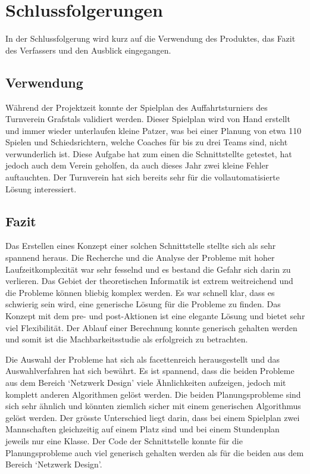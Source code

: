 %
%


\chapter{Schlussfolgerungen}\label{chap.Schlussfolgerungen}
In der Schlussfolgerung wird kurz auf die Verwendung des Produktes, das Fazit des Verfassers und den Ausblick eingegangen.

\section{Verwendung}\label{fazit_verwendung}
Während der Projektzeit konnte der Spielplan des Auffahrtsturniers des Turnverein Grafstals validiert werden. Dieser Spielplan wird von Hand erstellt und immer wieder unterlaufen 
kleine Patzer, was bei einer Planung von etwa 110 Spielen und Schiedsrichtern, welche Coaches für bis zu drei Teams sind, nicht verwunderlich ist. Diese Aufgabe hat zum einen die Schnittstellte 
getestet, hat jedoch auch dem Verein geholfen, da auch dieses Jahr zwei kleine Fehler auftauchten. Der Turnverein hat sich bereits sehr für die vollautomatisierte Lösung interessiert.

\section{Fazit}\label{fazit}

Das Erstellen eines Konzept einer solchen Schnittstelle stellte sich als sehr spannend heraus. Die Recherche und die Analyse der Probleme mit hoher Laufzeitkomplexität war sehr fesselnd und es 
bestand die Gefahr sich darin zu verlieren. Das Gebiet der theoretischen Informatik ist extrem weitreichend und die Probleme können bliebig komplex werden. Es war schnell klar, dass es schwierig 
sein wird, eine generische Lösung für die Probleme zu finden. Das Konzept mit dem pre- und post-Aktionen ist eine elegante Lösung und bietet sehr viel Flexibilität. Der Ablauf einer Berechnung 
konnte generisch gehalten werden und somit ist die Machbarkeitsstudie als erfolgreich zu betrachten.

Die Auswahl der Probleme hat sich als facettenreich herausgestellt und das Auswahlverfahren hat sich bewährt. Es ist spannend, dass die beiden Probleme aus dem Bereich `Netzwerk Design' 
viele Ähnlichkeiten aufzeigen, jedoch mit komplett anderen Algorithmen gelöst werden. Die beiden Planungsprobleme sind sich sehr ähnlich und könnten ziemlich sicher mit einem generischen 
Algorithmus gelöst werden. Der grösste Unterschied liegt darin, dass bei einem Spielplan zwei Mannschaften gleichzeitig auf einem Platz sind und bei einem 
Stundenplan jeweils nur eine Klasse. Der Code der Schnittstelle konnte für die Planungsprobleme auch viel generisch gehalten werden als für die beiden aus dem Bereich `Netzwerk Design'.

